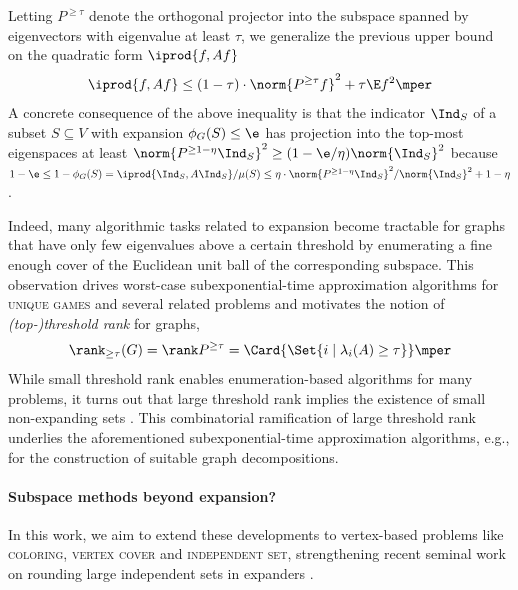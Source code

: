 Letting \(P^{\ge \tau}\) denote the orthogonal projector into the subspace spanned by eigenvectors with eigenvalue at least \(\tau\), we generalize the previous upper bound on the quadratic form \(\iprod{f,Af}\)
\begin{equation}
  \iprod{f,Af}
  \le (1-\tau)\cdot \norm{P^{\ge \tau}f}^{2} + \tau \E f^{2}
  \mper
\end{equation}
A concrete consequence of the above inequality is that the indicator \(\Ind_{S}\) of a subset \(S\subseteq V\) with expansion \(\phi_{G}(S)\le \e\)  has projection into the top-most eigenspaces at least \(\norm{P^{\ge 1-\eta}\Ind_{S}}^{2}\ge (1-\e/\eta)\norm{\Ind_{S}}^{2}\) because \(1-\e \le 1-\phi_{G}(S)=\iprod{\Ind_{S},A\Ind_{S}}/\mu(S)\le \eta\cdot \norm{P^{\ge 1-\eta}\Ind_{S}}^{2}/\norm{\Ind_{S}}^{2}+1-\eta\).

Indeed, many algorithmic tasks related to expansion become tractable for graphs that have only few eigenvalues above a certain threshold \cite{arora-khot-kolla-steurer-tulsiani-vishnoi,arora-barak-steurer,barak-raghavendra-steurer,guruswami-sinop} by enumerating a fine enough cover of the Euclidean unit ball of the corresponding subspace.
This observation drives worst-case subexponential-time approximation algorithms for \textsc{unique games} and several related problems \cite{arora-barak-steurer, steurer-d-games} and motivates the notion of \emph{(top-)threshold rank} for graphs,
\begin{equation}
  \rank_{\ge \tau}(G) = \rank P^{\ge \tau} = \Card{\Set{i \mid \lambda_{i}(A)\ge \tau}}
  \mper
\end{equation}
While small threshold rank enables enumeration-based algorithms for many problems, it turns out that large threshold rank implies the existence of small non-expanding sets \cite{arora-barak-steurer, steurer, lee-oveis-gharan-trevisan, raghavendra-vempala-tetali-louis}.
This combinatorial ramification of large threshold rank underlies the aforementioned subexponential-time approximation algorithms, e.g., for the construction of suitable graph decompositions.


\paragraph{Subspace methods beyond expansion?}

In this work, we aim to extend these developments to vertex-based problems like \textsc{coloring}, \textsc{vertex cover} and \textsc{independent set},
strengthening recent seminal work on rounding large independent sets in expanders \cite{bafna-hsieh-kothari}.

